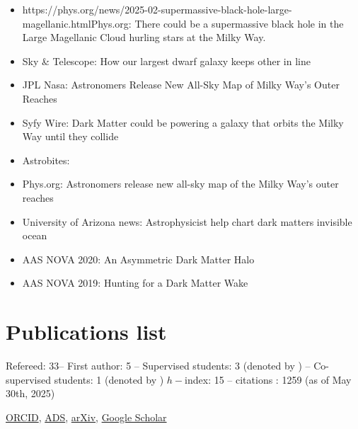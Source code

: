 \documentclass[14pt]{article}
\begin{document}
\begin{itemize}
  \setlength\itemsep{0.0em}
  \renewcommand\labelitemi{$\cdot$}
  \item
    {https://phys.org/news/2025-02-supermassive-black-hole-large-magellanic.html}{Phys.org: There
    could be a supermassive black hole in the Large Magellanic Cloud hurling
  stars at the Milky Way}.
  \item Sky \& Telescope: How our largest dwarf galaxy keeps other in line
  \item JPL Nasa: Astronomers Release New All-Sky Map of Milky Way’s Outer Reaches
  \item Syfy Wire: Dark Matter could be powering a galaxy that orbits the Milky Way until they collide
  \item Astrobites: 
  \item Phys.org: Astronomers release new all-sky map of the Milky Way's outer reaches
 \item University of Arizona news: Astrophysicist help chart dark matters invisible ocean
 \item AAS NOVA 2020: An Asymmetric Dark Matter Halo
 \item AAS NOVA 2019: Hunting for a Dark Matter Wake

\end{itemize}




\section*{Publications list}

Refereed: 33-- First author: 5 -- Supervised students: 3 (denoted by \dag ) --
Co-supervised students: 1 (denoted by \ddag) $h-$index: 15 -- citations : 1259 (as of May 30th, 2025) 

\noindent \href{https://orcid.org/0000-0001-7107-1744}{ORCID},
\href{https://ui.adsabs.harvard.edu/search/q=docs(library%2F0X5_bcuLT4iE-6-Nko0kmg)&sort=date%20desc%2C%20bibcode%20desc&p_=0}{ADS},
\href{https://arxiv.org/search/?query=garavito-camargo&searchtype=all}{arXiv},
\href{https://scholar.google.com/citations?user=QDLiOFYAAAAJ&hl=en&oi=ao}{Google
Scholar}\\
\end{document}
